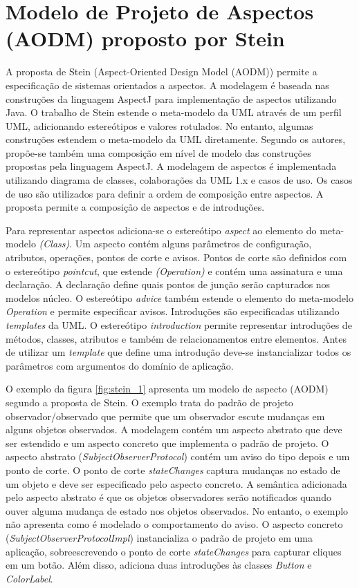\section{Modelo de Projeto de Aspectos (AODM) proposto por Stein}

A proposta de Stein (Aspect-Oriented Design Model (AODM)) \cite{stein:02} \cite{Stein02onrepresenting} \cite{stein:aosd-uml02} permite a especificação
de sistemas orientados a aspectos. A modelagem é baseada nas construções da linguagem AspectJ para implementação de aspectos utilizando Java. O
trabalho de Stein estende o meta-modelo da UML através de um perfil UML, adicionando estereótipos e valores rotulados. No entanto, algumas
construções estendem o meta-modelo da UML diretamente. Segundo os autores, propõe-se também uma composição em nível de modelo das construções
propostas pela linguagem AspectJ. A modelagem de aspectos é implementada utilizando diagrama de classes, colaborações da UML 1.x e casos de uso. Os
casos de uso são utilizados para definir a ordem de composição entre aspectos. A proposta permite a composição de aspectos e de introduções.

Para representar aspectos adiciona-se o estereótipo \textit{aspect} ao elemento do meta-modelo \textit{(Class)}. Um aspecto contém alguns parâmetros
de configuração, atributos, operações, pontos de corte e avisos. Pontos de corte são definidos com o estereótipo \textit{pointcut}, que 
estende \textit{(Operation)} e contém uma assinatura e uma declaração. A declaração define quais pontos de junção serão capturados nos modelos
núcleo. O estereótipo \textit{advice} também estende o elemento do meta-modelo \textit{Operation} e permite especificar avisos. 
Introduções são especificadas utilizando \textit{templates} da UML.  O estereótipo \textit{introduction} permite representar introduções de métodos,
classes, atributos e também de relacionamentos entre elementos. Antes de utilizar um \textit{template} que define uma introdução deve-se instancializar 
todos os parâmetros com argumentos do domínio de aplicação. 

O exemplo da figura \ref{fig:stein_1} apresenta um modelo de aspecto (AODM) segundo a proposta de Stein. O exemplo trata do padrão de projeto
observador/observado que permite que um observador escute mudanças em alguns objetos observados. A modelagem contém um aspecto abstrato que deve ser
estendido e um aspecto concreto que implementa o padrão de projeto. O aspecto abstrato (\textit{SubjectObserverProtocol}) contém um aviso do tipo
depois e um ponto de corte. O ponto de corte \textit{stateChanges} captura mudanças no estado de um objeto e deve ser especificado pelo aspecto
concreto. A semântica adicionada pelo aspecto abstrato é que os objetos observadores serão notificados quando ouver alguma mudança de estado nos
objetos observados. No entanto, o exemplo não apresenta como é modelado o comportamento do aviso. O aspecto concreto
(\textit{SubjectObserverProtocolImpl}) instancializa o padrão de projeto em uma aplicação, sobreescrevendo o ponto de corte \textit{stateChanges} para 
capturar cliques em um botão. Além disso, adiciona duas introduções às classes \textit{Button} e \textit{ColorLabel}. 

